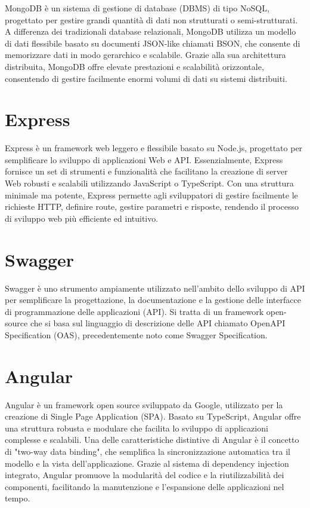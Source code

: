 \documentclass[12pt,a4paper,openright,twoside]{book}
\begin{document}
MongoDB è un sistema di gestione di database (DBMS) di tipo NoSQL, progettato per gestire grandi quantità di dati non strutturati o semi-strutturati. A differenza dei tradizionali database relazionali, MongoDB utilizza un modello di dati flessibile basato su documenti JSON-like chiamati BSON, che consente di memorizzare dati in modo gerarchico e scalabile. Grazie alla sua architettura distribuita, MongoDB offre elevate prestazioni e scalabilità orizzontale, consentendo di gestire facilmente enormi volumi di dati su sistemi distribuiti.

\section{Express}

Express è un framework web leggero e flessibile basato su Node.js, progettato per semplificare lo sviluppo di applicazioni Web e API. Essenzialmente, Express fornisce un set di strumenti e funzionalità che facilitano la creazione di server Web robusti e scalabili utilizzando JavaScript o TypeScript. Con una struttura minimale ma potente, Express permette agli sviluppatori di gestire facilmente le richieste HTTP, definire route, gestire parametri e risposte, rendendo il processo di sviluppo web più efficiente ed intuitivo.

\section{Swagger}

Swagger è uno strumento ampiamente utilizzato nell'ambito dello sviluppo di API per semplificare la progettazione, la documentazione e la gestione delle interfacce di programmazione delle applicazioni (API). Si tratta di un framework open-source che si basa sul linguaggio di descrizione delle API chiamato OpenAPI Specification (OAS), precedentemente noto come Swagger Specification.

\section{Angular}

Angular è un framework open source sviluppato da Google, utilizzato per la creazione di Single Page Application (SPA). Basato su TypeScript, Angular offre una struttura robusta e modulare che facilita lo sviluppo di applicazioni complesse e scalabili. Una delle caratteristiche distintive di Angular è il concetto di "two-way data binding", che semplifica la sincronizzazione automatica tra il modello e la vista dell'applicazione. Grazie al sistema di dependency injection integrato, Angular promuove la modularità del codice e la riutilizzabilità dei componenti, facilitando la manutenzione e l'espansione delle applicazioni nel tempo. 
\end{document}
